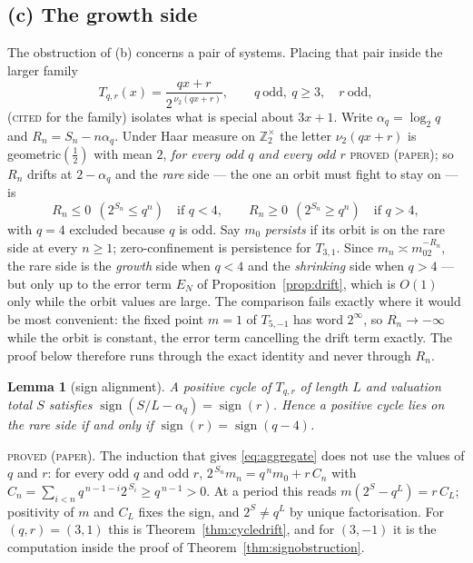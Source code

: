 \documentclass[11pt,reqno]{amsart}
\theoremstyle{plain}
\newtheorem{lemma}[theorem]{Lemma}
\theoremstyle{definition}
\newcommand{\Zt}{\mathbb{Z}_2}
\newcommand{\vt}{\nu_2}
\newcommand{\lab}[1]{\textnormal{\textsc{\small #1}}}
\begin{document}
\subsection*{(c) The growth side}

The obstruction of (b) concerns a pair of systems. Placing that pair inside the
larger family
\[
T_{q,r}(x)=\frac{qx+r}{2^{\,\vt(qx+r)}},\qquad q\ \text{odd},\ q\ge3,\quad
r\ \text{odd},
\]
(\lab{cited} \cite{Lagarias1985} for the family) isolates what is special about
$3x+1$. Write $\alpha_q=\log_2 q$ and $R_n=S_n-n\alpha_q$. Under Haar measure on
$\Zt^{\times}$ the letter $\vt(qx+r)$ is geometric$(\tfrac12)$ with mean $2$,
\emph{for every odd $q$ and every odd $r$} \lab{proved (paper)}; so $R_n$ drifts at
$2-\alpha_q$ and the \emph{rare} side --- the one an orbit must fight to stay on ---
is
\[
R_n\le0\ \ (2^{S_n}\le q^n)\quad\text{if } q<4,\qquad
R_n\ge0\ \ (2^{S_n}\ge q^n)\quad\text{if } q>4,
\]
with $q=4$ excluded because $q$ is odd. Say $m_0$ \emph{persists} if its orbit is on
the rare side at every $n\ge1$; zero-confinement is persistence for $T_{3,1}$. Since
$m_n\asymp m_02^{-R_n}$, the rare side is the \emph{growth} side when $q<4$ and the
\emph{shrinking} side when $q>4$ --- but only up to the error term $E_N$ of
Proposition~\ref{prop:drift}, which is $O(1)$ only while the orbit values are large.
The comparison fails exactly where it would be most convenient: the fixed point
$m=1$ of $T_{5,-1}$ has word $2^{\infty}$, so $R_n\to-\infty$ while the orbit is
constant, the error term cancelling the drift term exactly. The proof below
therefore runs through the exact identity and never through $R_n$.

\begin{lemma}[sign alignment]\label{lem:signalign}
A positive cycle of $T_{q,r}$ of length $L$ and valuation total $S$ satisfies
$\operatorname{sign}(S/L-\alpha_q)=\operatorname{sign}(r)$. Hence a positive cycle
lies on the rare side if and only if $\operatorname{sign}(r)=\operatorname{sign}(q-4)$.
\end{lemma}
\lab{proved (paper)}. The induction that gives \eqref{eq:aggregate} does not use the
values of $q$ and $r$: for every odd $q$ and odd $r$,
$2^{\,S_n}m_n=q^{\,n}m_0+r\,C_n$ with $C_n=\sum_{i<n}q^{\,n-1-i}2^{\,S_i}\ge q^{\,n-1}>0$.
At a period this reads $m(2^{S}-q^{L})=r\,C_L$; positivity of $m$ and $C_L$ fixes the sign, and
$2^{S}\ne q^{L}$ by unique factorisation. For $(q,r)=(3,1)$ this is
Theorem~\ref{thm:cycledrift}, and for $(3,-1)$ it is the computation inside the
proof of Theorem~\ref{thm:signobstruction}.
\end{document}
